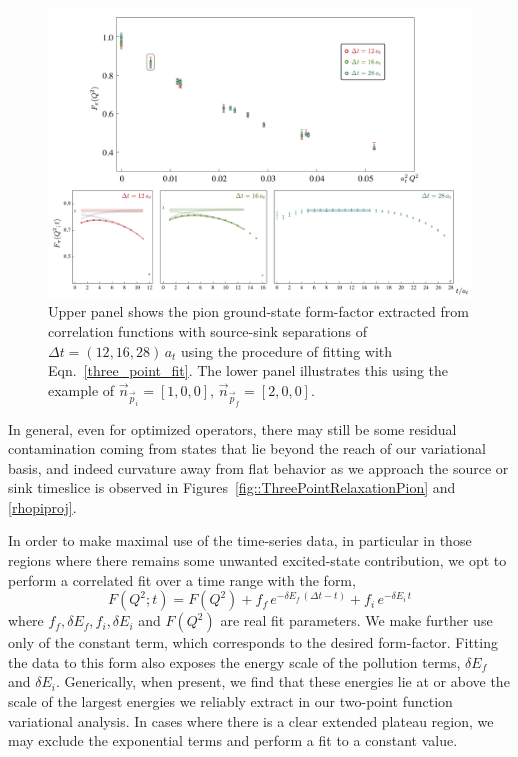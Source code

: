 \documentclass[twocolumn,amsmath,amssymb,prd,10pt,floatfix, 
superscriptaddress,nofootinbib, showpacs, preprintnumbers]{revtex4-1}
\begin{document}
\begin{figure}
\includegraphics[width=0.9\linewidth]{fig8.pdf}
\caption{ Upper panel shows the pion ground-state form-factor extracted from correlation functions with source-sink separations of $\Delta t = (12,16,28)\, a_t$ using the procedure of fitting with Eqn.~\ref{three_point_fit}. The lower panel illustrates this using the example of $\vec{n}_{\vec{p}_i} = [1,0,0],\, \vec{n}_{\vec{p}_f} = [2,0,0]$.
\label{fig::ThreePointSourceSinkSeparation}  }
\end{figure}




In general, even for optimized operators, there may still be some residual contamination coming from states that lie beyond the reach of our variational basis, and indeed curvature away from flat behavior as we approach the source or sink timeslice is observed in Figures~\ref{fig::ThreePointRelaxationPion} and \ref{rhopiproj}. 

In order to make maximal use of the time-series data, in particular in those regions where there remains some unwanted excited-state contribution, we opt to perform a correlated fit over a time range with the form,
\begin{equation}
F(Q^2; t) =  F(Q^2)  + f_f \, e^{-\delta E_{f}\,(\Delta t - t)} + f_{i} \,  e^{- \delta E_i\, t} 
\label{three_point_fit}
\end{equation}
where $f_f, \delta E_f, f_i, \delta E_i$ and $F(Q^2)$ are real fit parameters. We make further use only of the constant term, which corresponds to the desired form-factor. Fitting the data to this form also exposes the energy scale of the pollution terms, $\delta E_f$ and $\delta E_i$. Generically, when present, we find that these energies lie at or above the scale of the largest energies we reliably extract in our two-point function variational analysis. In cases where there is a clear extended plateau region, we may exclude the exponential terms and perform a fit to a constant value.
\end{document}
